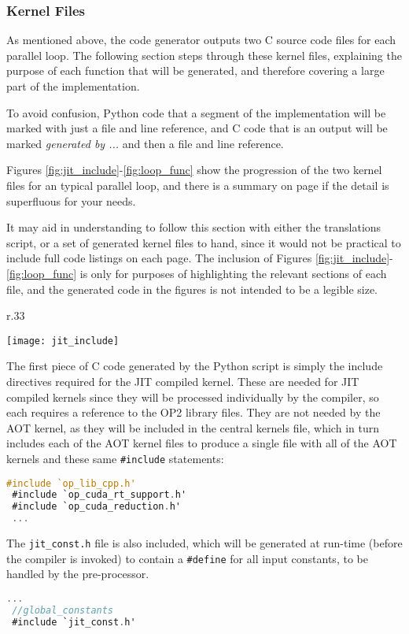 \subsubsection{Kernel Files}
\label{ss:krnl_files}
As mentioned above, the code generator outputs two C source code files for each parallel loop. The following section steps through these kernel files, explaining the purpose of each function that will be generated, and therefore covering a large part of the implementation.
\par To avoid confusion, Python code that a segment of the implementation will be marked with just a file and line reference, and C code that is an output will be marked \textit{generated by ...} and then a file and line reference.
\par
Figures \ref{fig:jit_include}-\ref{fig:loop_func} show the progression of the two kernel files for an typical parallel loop, and there is a summary on page \pageref{impl_summary} if the detail is superfluous for your needs.
\par
It may aid in understanding to follow this section with either the translations script, or a set of generated kernel files to hand, since it would not be practical to include full code listings on each page. The inclusion of Figures \ref{fig:jit_include}-\ref{fig:loop_func} is only for purposes of highlighting the relevant sections of each file, and the generated code in the figures is not intended to be a legible size.

\clearpage
%
\begin{wrapfigure}[21]{r}{.33\textwidth}
  \centering
  \caption{JIT includes}
  \label{fig:jit_include}
  \texttt{[image: jit\_include]}
\end{wrapfigure}
The first piece of C code generated by the Python script is simply the include directives required for the JIT compiled kernel. These are needed for JIT compiled kernels since they will be processed individually by the compiler, so each requires a reference to the OP2 library files. They are not needed by the AOT kernel, as they will be included in the central kernels file, which in turn includes each of the AOT kernel files to produce a single file with all of the AOT kernels and these same \verb|#include| statements:
\begin{lstlisting}[backgroundcolor = \color{green!20}, language=C]
 #include `op_lib_cpp.h'
 #include `op_cuda_rt_support.h'
 #include `op_cuda_reduction.h'
 ...
\end{lstlisting}
The \verb|jit_const.h| file is also included, which will be generated at run-time (before the compiler is invoked) to contain a \verb|#define| for all input constants, to be handled by the pre-processor.
\begin{lstlisting}[backgroundcolor = \color{green!20}, language=C]
 ...
 //global_constants
 #include `jit_const.h'
\end{lstlisting}

